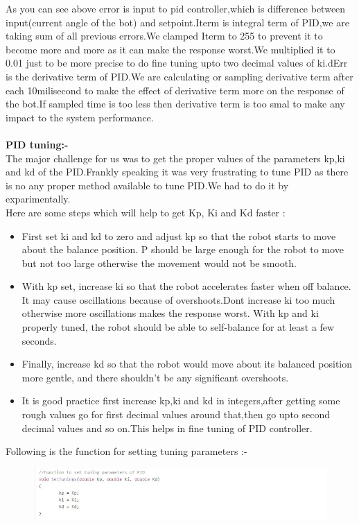 \documentclass[12pt]{report}
\begin{document}
    As you can see above error is input to pid controller,which is difference between input(current angle of the bot) and setpoint.Iterm is integral term of PID,we are taking sum of all previous errors.We clamped Iterm to 255 to prevent it to become more and more as it can make the response worst.We multiplied it to 0.01 just to be more precise to do fine tuning upto two decimal values of ki.dErr is the derivative term of PID.We are calculating or sampling derivative term after each 10milisecond to make the effect of derivative term more on the response of the bot.If sampled time is too less then derivative term is too smal to make any impact to the system performance. \\ \\
    \textbf{PID tuning:-} \\
    The major challenge for us was to get the proper values of the parameters kp,ki and kd of the PID.Frankly speaking it was very frustrating to tune PID as there is no any proper method available to tune PID.We had to do it by exparimentally.\\
    Here are some steps which will help to get Kp, Ki and Kd faster :\\
    \begin{itemize}
    	\item First set ki and kd to zero and adjust kp so that the robot starts to move about the balance position. P should be large enough for the robot to move but not too large otherwise the movement would not be smooth.
    	\item With kp set, increase ki so that the robot accelerates faster when off balance. It may cause oscillations because of overshoots.Dont increase ki too much otherwise more oscillations makes the response worst. With kp and ki properly tuned, the robot should be able to self-balance for at least a few seconds.
    	\item Finally, increase kd so that the robot would move about its balanced position more gentle, and there shouldn’t be any significant overshoots.
    	\item It is good practice first increase kp,ki and kd in integers,after getting some rough values go for first decimal values around that,then go upto second decimal values and so on.This helps in fine tuning of PID controller.
    \end{itemize} 
    Following is the function for setting tuning parameters :-
    \begin{figure}[h]
    	\includegraphics{tuning.jpg}
    \end{figure} \\
    
\end{document}
